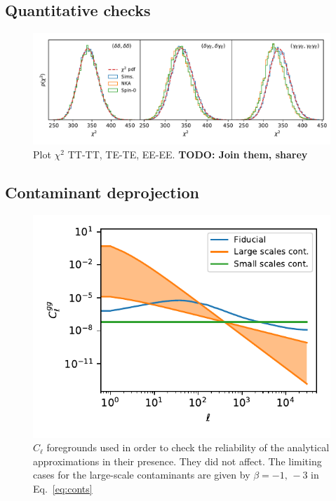 \documentclass[a4paper,11pt]{article}
\newcommand{\todo}[1]{{\bf TODO: #1}}
\newcommand{\cl}{C_\ell}
\begin{document}
\subsection{Quantitative checks}


\begin{figure}[htb]
  \centering
  \includegraphics[width=\textwidth]{./figures/run_sph_2b_1stbin_chi2_TT_TE_EE.pdf}
  \caption{Plot $\chi^2$ TT-TT, TE-TE, EE-EE. \todo{Join them, sharey}}
  \label{fig:chi2_1bin}
\end{figure}


\subsection{Contaminant deprojection}
\begin{figure}
  \centering
  \includegraphics[width=\columnwidth]{./figures/foreground.pdf}
  \caption{$\cl$ foregrounds used in order to check the reliability of the
    analytical approximations in their presence. They did not affect. The
    limiting cases for the large-scale contaminants are given by $\beta=-1,\,
    -3$ in Eq.~\ref{eq:conts}}
  \label{fig:conts}
\end{figure}
\end{document}
